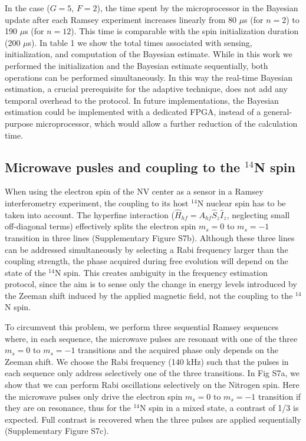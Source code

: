 \documentclass{report}
\begin{document}
In the case ($G = 5$, $F = 2$), the time spent by the microprocessor in the Bayesian update after each Ramsey experiment increases linearly from 80 $\mu$s (for $n = 2$) to 190 $\mu$s (for $n = 12$). This time is comparable with the spin initialization duration (200 $\mu$s). In table 1 we show the total times associated with sensing, initialization, and computation of the Bayesian estimate. While in this work we performed the initialization and the Bayesian estimate sequentially, both operations can be performed simultaneously. In this way the real-time Bayesian estimation, a crucial prerequisite for the adaptive technique, does not add any temporal overhead to the protocol. In future implementations, the Bayesian estimation could be implemented with a dedicated FPGA, instead of a general-purpose microprocessor, which would allow a further reduction of the calculation time.

\subsection{Microwave pusles and coupling to the $^{14}$N spin}
When using the electron spin of the NV center as a sensor in a Ramsey interferometry experiment, the coupling to its host $^{14}$N nuclear spin has to be taken into account. The hyperfine interaction ($\hat{H}_{hf}=A_{hf} \hat{S}_z \hat{I}_z$, neglecting small off-diagonal terms) effectively splits the electron spin $m_s = 0 $ to $m_s = -1$ transition in three lines (Supplementary Figure S7b).  Although these three lines can be addressed simultaneously by selecting a Rabi frequency larger than the coupling strength, the phase acquired during free evolution will depend on the state of the $^{14}$N spin. This creates ambiguity in the frequency estimation protocol, since the aim is to sense only the change in energy levels introduced by the Zeeman shift induced by the applied magnetic field, not the coupling to the $^{14}$N spin.

To circumvent this problem, we perform three sequential Ramsey sequences where, in each sequence, the microwave pulses are resonant with one of the three $m_s = 0$ to $m_s = -1$ transitions and the acquired phase only depends on the Zeeman shift. We choose the Rabi frequency (140 kHz) such that the pulses in each sequence only address selectively one of the three transitions. In Fig S7a, we show that we can perform Rabi oscillations selectively on the Nitrogen spin. Here the microwave pulses only drive the electron spin $m_s = 0$ to $m_s = -1$ transition if they are on resonance, thus for the $^{14}$N spin in a mixed state, a contrast of 1/3 is expected. Full contrast is recovered when the three pulses are applied sequentially (Supplementary Figure S7c).
\end{document}
